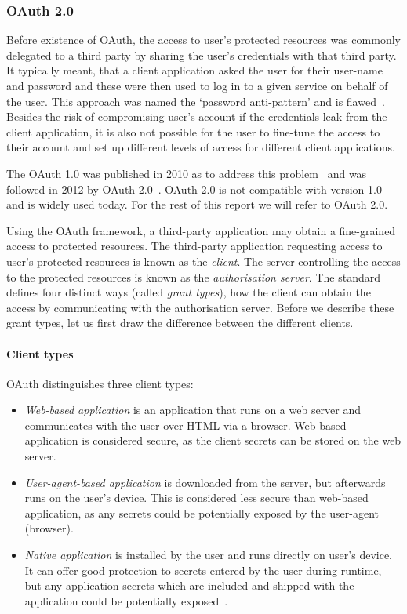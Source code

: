 \subsubsection{OAuth 2.0} \label{sec:OAuth_2}

Before existence of OAuth, the access to user's protected resources was commonly delegated to a third party by sharing the user's credentials with that third party. It typically meant, that a client application asked the user for their user-name and password and these were then used to log in to a given service on behalf of the user. This approach was named the `password anti-pattern' and is flawed~\cite{Paul2010OAuthAnti-pattern}. Besides the risk of compromising user's account if the credentials leak from the client application, it is also not possible for the user to fine-tune the access to their account and set up different levels of access for different client applications. 

The OAuth 1.0 was published in 2010 as to address this problem~\cite{Hammer-Lahav2010TheProtocol} and was followed in 2012 by OAuth 2.0~\cite{Hardt2012TheFramework}. OAuth 2.0 is not compatible with version 1.0 and is widely used today. For the rest of this report we will refer to OAuth 2.0.

Using the OAuth framework, a third-party application may obtain a fine-grained access to protected resources. The third-party application requesting access to user's protected resources is known as the \textit{client}. The server controlling the access to the protected resources is known as the \textit{authorisation server}. The standard defines four distinct ways (called \textit{grant types}), how the client can obtain the access by communicating with the authorisation server. Before we describe these grant types, let us first draw the difference between the different clients.

\paragraph{Client types} OAuth distinguishes three client types:
\begin{itemize}[noitemsep]
    \item \textit{Web-based application} is an application that runs on a web server and communicates with the user over HTML via a browser. Web-based application is considered secure, as the client secrets can be stored on the web server.
    \item \textit{User-agent-based application} is downloaded from the server, but afterwards runs on the user's device. This is considered less secure than web-based application, as any secrets could be potentially exposed by the user-agent (browser).
    \item \textit{Native application} is installed by the user and runs directly on user's device. It can offer good protection to secrets entered by the user during runtime, but any application secrets which are included and shipped with the application could be potentially exposed~\cite{Hardt2012TheFramework}.
\end{itemize}

